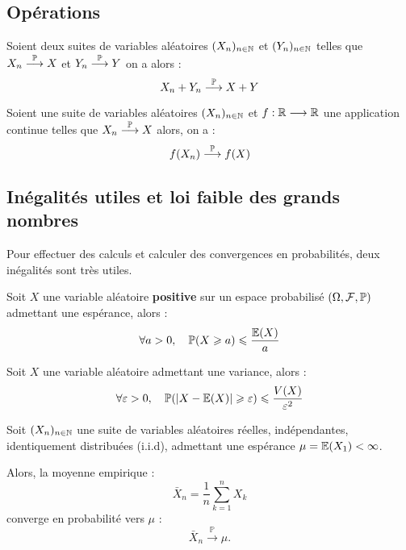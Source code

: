\subsection{Opérations}

\begin{prop}
    Soient deux suites de variables aléatoires $(X_n)_{n \in \mathbb{N}}$ et $(Y_n)_{n \in \mathbb{N}}$ telles que 
    $X_n \overset{\mathbb{P}}{\longrightarrow} X$ et $ Y_n \overset{\mathbb{P}}{\longrightarrow} Y$ on a alors : 
        \[ X_n + Y_n \overset{\mathbb{P}}{\longrightarrow} X + Y \] 
\end{prop}

\begin{prop}
    Soient une suite de variables aléatoires $(X_n)_{n \in \mathbb{N}}$ et $f : \mathbb{R} \longrightarrow \mathbb{R}$ une application 
    continue telles que $X_n \overset{\mathbb{P}}{\longrightarrow} X$ alors, on a : 
        \[ f(X_n) \overset{\mathbb{P}}{\longrightarrow} f(X) \] 
\end{prop}

\subsection{Inégalités utiles et loi faible des grands nombres}

Pour effectuer des calculs et calculer des convergences en probabilités, deux inégalités sont très utiles. 

\begin{proposition}
    Soit $X$ une variable aléatoire \textbf{positive} sur un espace probabilisé $(\Omega, \mathcal{F}, \mathbb{P})$ 
    admettant une espérance, alors : 
        \[ \forall a > 0, \quad \mathbb{P} (X \geqslant a) \leqslant \frac{\mathbb{E}(X)}{a}  \] 
\end{proposition}

\begin{proposition}
    Soit $X$ une variable aléatoire admettant une variance, alors : 
        \[ \forall \varepsilon > 0, \quad \mathbb{P}(|X - \mathbb{E}(X)| \geqslant \varepsilon) \leqslant \frac{V(X)}{\varepsilon^2} \] 
\end{proposition}

\begin{theorem}
    Soit $(X_n)_{n \in \mathbb{N}}$ une suite de variables aléatoires réelles, indépendantes, identiquement 
    distribuées (i.i.d), admettant une espérance $\mu = \mathbb{E}(X_1) < \infty$.

    Alors, la moyenne empirique :
    \[
        \bar{X}_n = \frac{1}{n} \sum_{k=1}^{n} X_k
    \]
    converge en probabilité vers $\mu$ :
    \[
        \bar{X}_n \overset{\mathbb{P}}{\longrightarrow} \mu.
    \]
\end{theorem}

